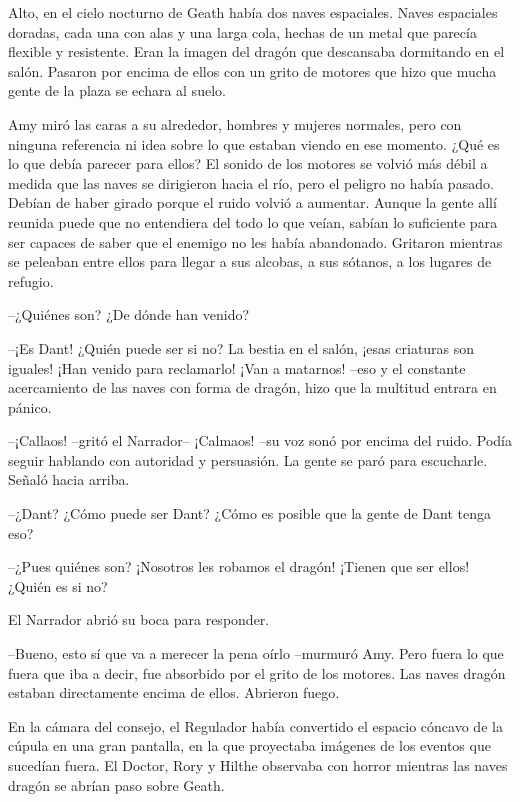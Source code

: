 {Alto, en el cielo nocturno de Geath había dos naves espaciales. Naves
	espaciales doradas, cada una con alas y una larga cola, hechas de un
	metal que parecía flexible y resistente. Eran la imagen del dragón que
	descansaba dormitando en el salón. Pasaron por encima de ellos con un
	grito de motores que hizo que mucha gente de la plaza se echara al
suelo.}

{Amy miró las caras a su alrededor, hombres y mujeres normales, pero con
	ninguna referencia ni idea sobre lo que estaban viendo en ese momento.
	¿Qué es lo que debía parecer para ellos? El sonido de los motores se
	volvió más débil a medida que las naves se dirigieron hacia el río, pero
	el peligro no había pasado. Debían de haber girado porque el ruido
	volvió a aumentar. Aunque la gente allí reunida puede que no entendiera
	del todo lo que veían, sabían lo suficiente para ser capaces de saber
	que el enemigo no les había abandonado. Gritaron mientras se peleaban
	entre ellos para llegar a sus alcobas, a sus sótanos, a los lugares de
refugio.}

{--¿Quiénes son? ¿De dónde han venido?}

{--¡Es Dant! ¿Quién puede ser si no? La bestia en el salón, ¡esas
	criaturas son iguales! ¡Han venido para reclamarlo! ¡Van a matarnos!
	--eso y el constante acercamiento de las naves con forma de dragón, hizo
que la multitud entrara en pánico.}

{--¡Callaos! --gritó el Narrador-- ¡Calmaos! --su voz sonó por encima
	del ruido. Podía seguir hablando con autoridad y persuasión. La gente se
paró para escucharle. Señaló hacia arriba.}

{--¿Dant? ¿Cómo puede ser Dant? ¿Cómo es posible que la gente de Dant
tenga eso?}

{--¿Pues quiénes son? ¡Nosotros les robamos el dragón! ¡Tienen que ser
ellos! ¿Quién es si no?}

{El Narrador abrió su boca para responder.}

{--Bueno, esto sí que va a merecer la pena oírlo --murmuró Amy. Pero
	fuera lo que fuera que iba a decir, fue absorbido por el grito de los
	motores. Las naves dragón estaban directamente encima de ellos. Abrieron
fuego.}

\mbox{}

{En la cámara del consejo, el Regulador había convertido el espacio
	cóncavo de la cúpula en una gran pantalla, en la que proyectaba imágenes
	de los eventos que sucedían fuera. El Doctor, Rory y Hilthe observaba
con horror mientras las naves dragón se abrían paso sobre Geath.}

